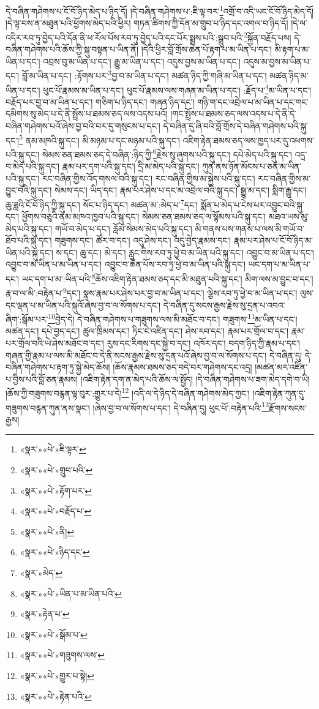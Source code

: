དེ་བཞིན་གཤེགས་པ་ངོ་བོ་ཉིད་མེད་པ་ཉིད་དོ། །དེ་བཞིན་གཤེགས་པ་:ཇི་ལྟ་བར་\footnote{«སྣར་»«པེ་»ཇི་ལྟར་}འགྲོ་བ་འདི་ཡང་ངོ་བོ་ཉིད་མེད་དོ། །དེ་ལྟ་བས་ན་མཐུན་པའི་ཕྱོགས་མེད་པའི་ཕྱིར། གཏན་ཚིགས་ཀྱི་དོན་མ་གྲུབ་པ་ཉིད་དང་འགལ་བ་ཉིད་དོ། །དེ་ལ་འདིར་རབ་ཏུ་བྱེད་པའི་དོན་ནི་ཕ་རོལ་པོས་རབ་ཏུ་བྱེད་པའི་དང་པོར་སྨྲས་པའི་:སྒྲུབ་པའི་\footnote{«སྣར་»«པེ་»གྲུབ་པའི་}སྐྱོན་བརྗོད་པས། དེ་བཞིན་གཤེགས་པའི་ཆོས་ཀྱི་སྐུ་བསྟན་པ་ཡིན་ནོ། །དེའི་ཕྱིར་བློ་གྲོས་ཆེན་པོ་རྟག་པ་མ་ཡིན་པ་དང་། མི་རྟག་པ་མ་ཡིན་པ་དང་། འབྲས་བུ་མ་ཡིན་པ་དང་། རྒྱུ་མ་ཡིན་པ་དང་། འདུས་བྱས་མ་ཡིན་པ་དང་། འདུས་མ་བྱས་མ་ཡིན་པ་དང་། བློ་མ་ཡིན་པ་དང་། :རྟོགས་པར་\footnote{«སྣར་»«པེ་»རྟོག་པར་}བྱ་བ་མ་ཡིན་པ་དང་། མཚན་ཉིད་ཀྱི་གཞི་མ་ཡིན་པ་དང་། མཚན་ཉིད་མ་ཡིན་པ་དང་། ཕུང་པོ་རྣམས་མ་ཡིན་པ་དང་། ཕུང་པོ་རྣམས་ལས་གཞན་མ་ཡིན་པ་དང་། :རྗོད་པ་\footnote{«སྣར་»«པེ་»བརྗོད་པ་}མ་ཡིན་པ་དང་། བརྗོད་པར་བྱ་བ་མ་ཡིན་པ་དང་། གཅིག་པ་ཉིད་དང་། གཞན་ཉིད་དང་། གཉི་ག་དང་འབྲེལ་པ་མ་ཡིན་པ་དང་གང་དམིགས་སུ་མེད་པ་དེ་ནི་སྤྲོས་པ་ཐམས་ཅད་ལས་འདས་པའོ། །གང་སྤྲོས་པ་ཐམས་ཅད་ལས་འདས་པ་དེ་ནི་དེ་བཞིན་གཤེགས་པའོ་ཞེས་བྱ་བའི་བར་དུ་གསུངས་པ་དང་། དེ་བཞིན་དུ་ཞི་བའི་བློ་གྲོས་དེ་བཞིན་གཤེགས་པའི་སྐུ་དང་།\footnote{«སྣར་»«པེ་»ནི།} ནམ་མཁའི་སྐུ་དང་། མི་མཉམ་པ་དང་མཉམ་པའི་སྐུ་དང་། འཇིག་རྟེན་ཐམས་ཅད་ལས་ཁྱད་པར་དུ་འཕགས་པའི་སྐུ་དང་། སེམས་ཅན་ཐམས་ཅད་དེ་བཞིན་:ཉིད་ཀྱི་\footnote{«སྣར་»«པེ་»ཉིད་དང་}རྗེས་སུ་ཞུགས་པའི་སྐུ་དང་། དཔེ་མེད་པའི་སྐུ་དང་། འདྲ་བ་མེད་པའི་སྐུ་དང་། རྣམ་པར་དག་པའི་སྐུ་དང་། དྲི་མ་མེད་པའི་སྐུ་དང་། ཀུན་ནས་ཉོན་མོངས་པ་ཅན་མ་ཡིན་པའི་སྐུ་དང་། རང་བཞིན་གྱིས་འོད་གསལ་བའི་སྐུ་དང་། རང་བཞིན་གྱིས་མ་སྐྱེས་པའི་སྐུ་དང་། རང་བཞིན་གྱིས་མ་བྱུང་བའི་སྐུ་དང་། སེམས་དང་། ཡིད་དང་། རྣམ་པར་ཤེས་པ་དང་མ་འབྲེལ་བའི་སྐུ་དང་། སྒྱུ་མ་དང་། སྨིག་རྒྱུ་དང་། ཆུ་ཟླའི་ངོ་བོ་ཉིད་ཀྱི་སྐུ་དང་། སོང་པ་ཉིད་དང་། མཚན་མ་:མེད་པ་\footnote{«སྣར་»མེད་}དང་། སྨོན་པ་མེད་པ་ངེས་པར་འབྱུང་བའི་སྐུ་དང་། ཕྱོགས་བཅུའི་ནམ་མཁའ་ཁྱབ་པའི་སྐུ་དང་། སེམས་ཅན་ཐམས་ཅད་ལ་སྙོམས་པའི་སྐུ་དང་། མཐའ་ཡས་མུ་མེད་པའི་སྐུ་དང་། གཡོ་བ་མེད་པ་དང་། རློམ་སེམས་མེད་པའི་སྐུ་དང་། མི་གནས་པས་གནས་པ་ལས་མི་གཡོ་བ་ཐོབ་པའི་སྐུ་དང་། གཟུགས་དང་། ཚོར་བ་དང་། འདུ་ཤེས་དང་། འདུ་བྱེད་རྣམས་དང་། རྣམ་པར་ཤེས་པ་ངོ་བོ་ཉིད་མ་ཡིན་པའི་སྐུ་དང་། ས་དང་། ཆུ་དང་། མེ་དང་། རླུང་གིས་རབ་ཏུ་ཕྱེ་བ་མ་ཡིན་པའི་སྐུ་དང་། འབྱུང་བ་མ་ཡིན་པ་དང་། འབྱུང་བ་མ་ཡིན་པ་མ་ཡིན་པ་དང་། འབྱུང་བ་ཆེན་པོས་རབ་ཏུ་ཕྱེ་བ་མ་ཡིན་པའི་སྐུ་དང་། ཡང་དག་པ་མ་ཡིན་པ་དང་། ཡང་དག་པ་མ་:ཡིན་པའི་\footnote{«སྣར་»«པེ་»ཡིན་པ་མ་ཡིན་པའི་}ཆོས་འཇིག་རྟེན་ཐམས་ཅད་དང་མི་མཐུན་པའི་སྐུ་དང་། མིག་ལས་མ་བྱུང་བ་དང་། རྣ་བ་ལ་མི་:བརྟེན་པ་\footnote{«སྣར་»རྟེན་པ་}དང་། སྣས་རྣམ་པར་ཤེས་པར་བྱ་བ་མ་ཡིན་པ་དང་། ལྕེས་རབ་ཏུ་ཕྱེ་བ་མ་ཡིན་པ་དང་། ལུས་དང་ལྡན་པ་མ་ཡིན་པའི་སྐུའོ་ཞེས་བྱ་བ་ལ་སོགས་པ་དང་། དེ་བཞིན་དུ་སངས་རྒྱས་རྗེས་སུ་དྲན་པ་འབའ་ཞིག་:སྒོམ་པར་\footnote{«སྣར་»«པེ་»སྒོམ་པ་}བྱེད་དེ། དེ་བཞིན་གཤེགས་པ་གཟུགས་ལས་མི་མཐོང་བ་དང་། གཟུགས་\footnote{«སྣར་»«པེ་»གཟུགས་ལས་}མ་ཡིན་པ་དང་། མཚན་དང་། དཔེ་བྱད་དང་། ཚུལ་ཁྲིམས་དང་། ཏིང་ངེ་འཛིན་དང་། ཤེས་རབ་དང་། རྣམ་པར་གྲོལ་བ་དང་། རྣམ་པར་གྲོལ་བའི་ཡེ་ཤེས་མཐོང་བ་དང་། རུས་དང་རིགས་དང་སྐྱེ་བ་དང་། འཁོར་དང་། བདག་ཉིད་ཀྱི་རྣམ་པ་དང་། གཞན་གྱི་རྣམ་པ་ལས་མི་མཐོང་བ་དེ་ནི་སངས་རྒྱས་རྗེས་སུ་དྲན་པའོ་ཞེས་བྱ་བ་ལ་སོགས་པ་དང་། དེ་བཞིན་དུ། དེ་བཞིན་གཤེགས་པ་རྟག་ཏུ་སྐྱེ་མེད་ཆོས། །ཆོས་རྣམས་ཐམས་ཅད་བདེ་བར་གཤེགས་དང་འདྲ། །མཚན་མར་འཛིན་པ་བྱིས་པའི་བློ་ཅན་རྣམས། །འཇིག་རྟེན་དག་ན་མེད་པའི་ཆོས་ལ་སྤྱོད། །དེ་བཞིན་གཤེགས་པ་ཟག་མེད་དགེ་བ་ཡི། །ཆོས་ཀྱི་གཟུགས་བརྙན་ལྟ་བུར་:གྱུར་པ་དེ།\footnote{«སྣར་»«པེ་»གྱུར་པ་སྟེ།} །འདི་ལ་དེ་ཉིད་དེ་བཞིན་གཤེགས་མེད་ཀྱང་། །འཇིག་རྟེན་ཀུན་དུ་གཟུགས་བརྙན་ཀུན་ནས་སྣང་། །ཞེས་བྱ་བ་ལ་སོགས་པ་དང་། དེ་བཞིན་དུ། ཕུང་པོ་:བརྟེན་པའི་\footnote{«སྣར་»«པེ་»རྟེན་པའི་}རྫོགས་སངས་རྒྱས། 